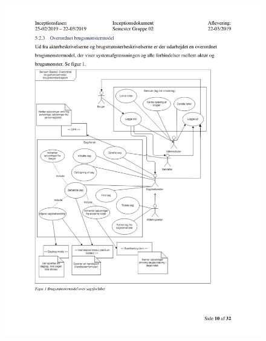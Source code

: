 \begin{figure}[hb]
  \includegraphics[scale = 0.33]{./PNG/Inceptions/Gruppe02+InceptionsDokument-11.jpg} 
\end{figure}

